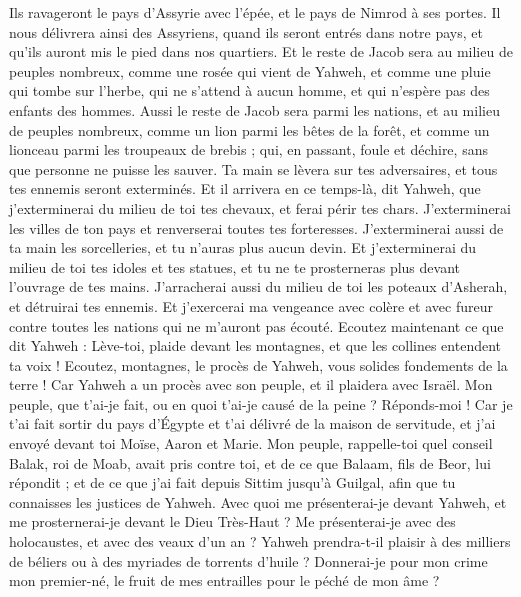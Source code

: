 \begin{multicols}{2}
Ils ravageront le pays d'Assyrie avec l'épée, et le pays de Nimrod à ses portes. Il nous délivrera ainsi des Assyriens, quand ils seront entrés dans notre pays, et qu'ils auront mis le pied dans nos quartiers.
Et le reste de Jacob sera au milieu de peuples nombreux, comme une rosée qui vient de Yahweh, et comme une pluie qui tombe sur l'herbe, qui ne s’attend à aucun homme, et qui n'espère pas des enfants des hommes.
Aussi le reste de Jacob sera parmi les nations, et au milieu de peuples nombreux, comme un lion parmi les bêtes de la forêt, et comme un lionceau parmi les troupeaux de brebis ; qui, en passant, foule et déchire, sans que personne ne puisse les sauver.
Ta main se lèvera sur tes adversaires, et tous tes ennemis seront exterminés.
Et il arrivera en ce temps-là, dit Yahweh, que j'exterminerai du milieu de toi tes chevaux, et ferai périr tes chars.
J'exterminerai les villes de ton pays et renverserai toutes tes forteresses.
J'exterminerai aussi de ta main les sorcelleries, et tu n'auras plus aucun devin.
Et j'exterminerai du milieu de toi tes idoles et tes statues, et tu ne te prosterneras plus devant l'ouvrage de tes mains.
J'arracherai aussi du milieu de toi les poteaux d'Asherah, et détruirai tes ennemis.
Et j'exercerai ma vengeance avec colère et avec fureur contre toutes les nations qui ne m'auront pas écouté.
\VerseOne{}Ecoutez maintenant ce que dit Yahweh : Lève-toi, plaide devant les montagnes, et que les collines entendent ta voix !
Ecoutez, montagnes, le procès de Yahweh, vous solides fondements de la terre ! Car Yahweh a un procès avec son peuple, et il plaidera avec Israël.
Mon peuple, que t'ai-je fait, ou en quoi t'ai-je causé de la peine ? Réponds-moi !
Car je t'ai fait sortir du pays d'Égypte et t'ai délivré de la maison de servitude, et j'ai envoyé devant toi Moïse, Aaron et Marie.
Mon peuple, rappelle-toi quel conseil Balak, roi de Moab, avait pris contre toi, et de ce que Balaam, fils de Beor, lui répondit ; et de ce que j'ai fait depuis Sittim jusqu'à Guilgal, afin que tu connaisses les justices de Yahweh.
Avec quoi me présenterai-je devant Yahweh, et me prosternerai-je devant le Dieu Très-Haut ? Me présenterai-je avec des holocaustes, et avec des veaux d'un an ?
Yahweh prendra-t-il plaisir à des milliers de béliers ou à des myriades de torrents d'huile ? Donnerai-je pour mon crime mon premier-né, le fruit de mes entrailles pour le péché de mon âme ?

\end{multicols}
